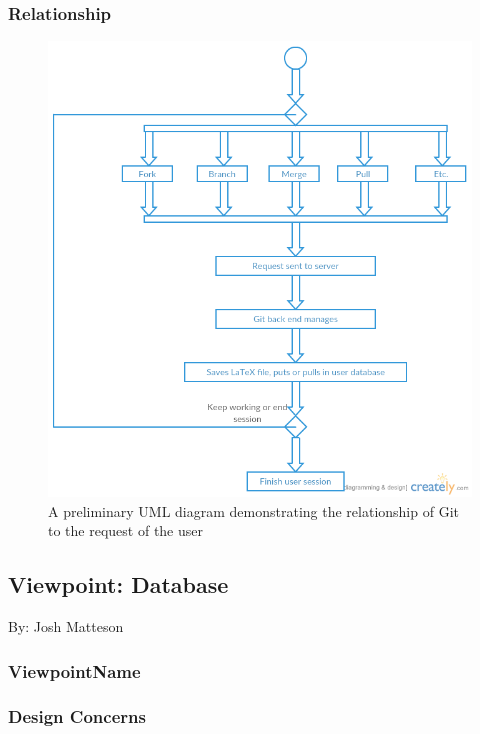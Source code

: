 \documentclass[letterpaper, 10pt, draftclsnofoot, compsoc, onecolumn]{IEEEtran}
\begin{document}
\newpage
\subsubsection{Relationship}
\begin{figure}[ht!]
\centering
\includegraphics[width=120mm]{Revision_Control.png}
\caption{A preliminary UML diagram demonstrating the relationship of Git to the request of the user}
\end{figure}

\newpage

\subsection{Viewpoint: Database}
{\noindent By: Josh Matteson \par}

\subsubsection{ViewpointName}
{\noindent  \par}

\subsubsection{Design Concerns}
{\noindent  \par}
\end{document}
